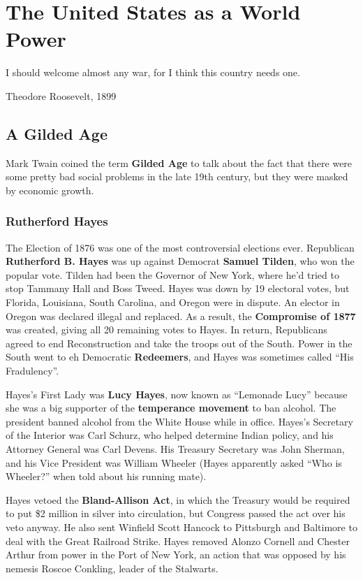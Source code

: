 \chapter{The United States as a World Power}

\epigraph{%
  I should welcome almost any war, for I think this country needs one.
}{Theodore Roosevelt, 1899}

\section{A Gilded Age}

Mark Twain coined the term \textbf{Gilded Age} to talk about the fact that there were some pretty bad social problems
in the late 19th century, but they were masked by economic growth.

\subsection*{Rutherford Hayes}

The Election of 1876 was one of the most controversial elections ever.
Republican \textbf{Rutherford B. Hayes} was up against Democrat \textbf{Samuel Tilden}, who won the popular vote.
Tilden had been the Governor of New York, where he'd tried to stop Tammany Hall and Boss Tweed.
Hayes was down by 19 electoral votes, but Florida, Louisiana, South Carolina, and Oregon were in dispute.
An elector in Oregon was declared illegal and replaced.
As a result, the \textbf{Compromise of 1877} was created, giving all 20 remaining votes to Hayes.
In return, Republicans agreed to end Reconstruction and take the troops out of the South.
Power in the South went to eh Democratic \textbf{Redeemers},
and Hayes was sometimes called ``His Fradulency''.

Hayes's First Lady was \textbf{Lucy Hayes},
now known as ``Lemonade Lucy'' because she was a big supporter of the \textbf{temperance movement} to ban alcohol.
The president banned alcohol from the White House while in office.
Hayes's Secretary of the Interior was Carl Schurz, who helped determine Indian policy,
and his Attorney General was Carl Devens.
His Treasury Secretary was John Sherman,
and his Vice President was William Wheeler
(Hayes apparently asked ``Who is Wheeler?'' when told about his running mate).

Hayes vetoed the \textbf{Bland-Allison Act},
in which the Treasury would be required to put \$2 million in silver into circulation,
but Congress passed the act over his veto anyway.
He also sent Winfield Scott Hancock to Pittsburgh and Baltimore to deal with the Great Railroad Strike.
Hayes removed Alonzo Cornell and Chester Arthur from power in the Port of New York,
an action that was opposed by his nemesis Roscoe Conkling, leader of the Stalwarts.


